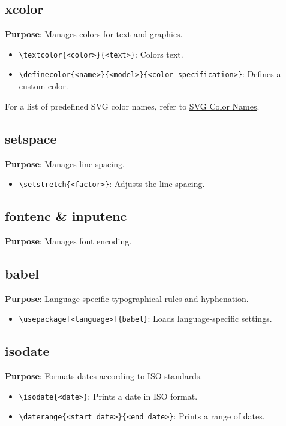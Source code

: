 \documentclass[12pt,twoside]{report}
\begin{document}
\subsection{xcolor}
\textbf{Purpose}: Manages colors for text and graphics.
\begin{itemize}
    \item \verb|\textcolor{<color>}{<text>}|: Colors text.
    \item \verb|\definecolor{<name>}{<model>}{<color specification>}|: Defines a custom color.
\end{itemize}
For a list of predefined SVG color names, refer to \href{https://www.latextemplates.com/svgnames-colors}{SVG Color Names}.

\subsection{setspace}
\textbf{Purpose}: Manages line spacing.
\begin{itemize}
    \item \verb|\setstretch{<factor>}|: Adjusts the line spacing.
\end{itemize}

\subsection{fontenc \& inputenc}
\textbf{Purpose}: Manages font encoding.

\subsection{babel}
\textbf{Purpose}: Language-specific typographical rules and hyphenation.
\begin{itemize}
    \item \verb|\usepackage[<language>]{babel}|: Loads language-specific settings.
\end{itemize}

\subsection{isodate}
\textbf{Purpose}: Formats dates according to ISO standards.
\begin{itemize}
    \item \verb|\isodate{<date>}|: Prints a date in ISO format.
    \item \verb|\daterange{<start date>}{<end date>}|: Prints a range of dates.
\end{itemize}
\end{document}
